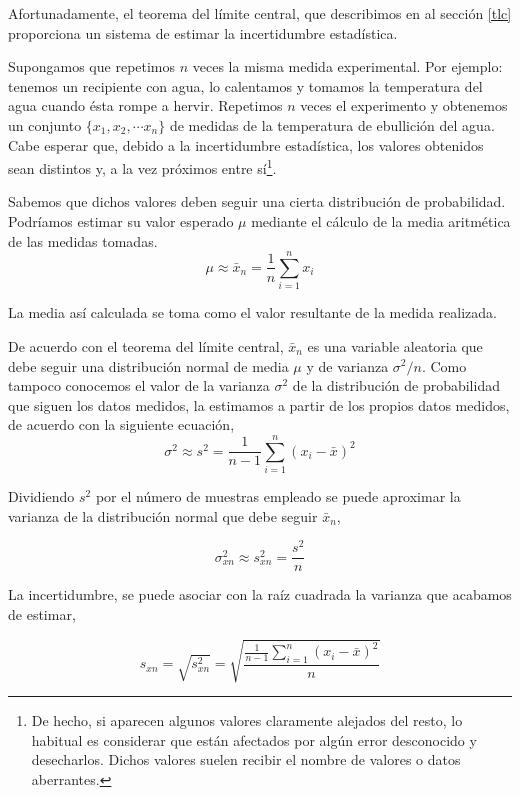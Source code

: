 Afortunadamente, el teorema del límite central, que describimos en al sección \ref{tlc} proporciona un sistema de estimar la incertidumbre estadística.

Supongamos que repetimos $n$ veces la misma medida experimental. Por ejemplo: tenemos un recipiente con agua, lo calentamos y tomamos la temperatura del agua cuando ésta rompe a hervir. Repetimos $n$ veces el experimento y obtenemos un conjunto $\{x_1,x_2,\cdots x_n \}$ de medidas de la temperatura de ebullición del agua. Cabe esperar que, debido a la incertidumbre estadística, los valores obtenidos sean distintos  y, a la vez próximos entre sí\footnote{De hecho, si aparecen algunos valores claramente alejados del resto, lo habitual es considerar que están afectados por algún error desconocido y desecharlos. Dichos valores suelen recibir el nombre de valores o datos aberrantes.}.

Sabemos que dichos valores deben seguir una cierta distribución de probabilidad. Podríamos estimar su valor esperado $\mu$ mediante el cálculo de la media aritmética de las medidas tomadas.
\begin{equation*}
\mu \approx \bar{x}_n = \frac{1}{n}\sum_{i=1}^n x_i
\end{equation*}

La media así calculada se toma como el valor resultante de la medida realizada.

De acuerdo con el teorema del límite central, $\bar{x}_n$ es una variable aleatoria que debe seguir una distribución normal de media $\mu$ y de varianza $\sigma^2/n$. Como tampoco conocemos el valor de la varianza $\sigma^2$ de la distribución de probabilidad que siguen los datos medidos, la estimamos a partir de los propios datos medidos, de acuerdo con la siguiente ecuación,
\begin{equation*}
\sigma^2 \approx s^2 = \frac{1}{n-1}\sum_{i=1}^n(x_i-\bar{x})^2
\end{equation*}

Dividiendo $s^2$ por el número de muestras empleado se puede aproximar la varianza de la distribución normal que debe seguir $\bar{x}_n$,

\begin{equation*}
\sigma^2_{xn} \approx s^2_{xn} = \frac{s^2}{n}
\end{equation*}

La incertidumbre, se puede asociar con la raíz cuadrada la varianza que acabamos de estimar,

\begin{equation*}
s_{xn}=\sqrt{s^2_{xn}}=\sqrt{\frac{\frac{1}{n-1}\sum_{i=1}^n(x_i-\bar{x})^2}{n}}
\end{equation*}

